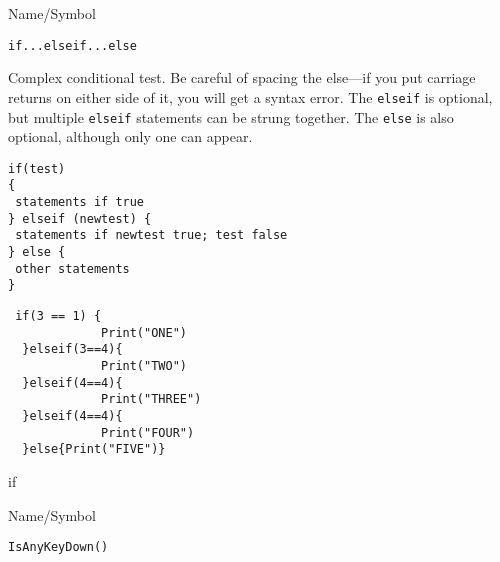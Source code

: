 \rl




\begin{desc}{Name/Symbol}
\item[Name/Symbol]	\verb+if...elseif...else+            

\item[Description] Complex conditional test.  Be careful of spacing
  the else---if you put carriage returns on either side of it, you
  will get a syntax error. The \verb+elseif+ is optional, but
  multiple \verb+elseif+ statements can be strung together.  The
  \verb+else+ is also optional, although only one can appear.

\item[Usage]
\begin{verbatim}
if(test)
{
 statements if true
} elseif (newtest) {
 statements if newtest true; test false
} else {
 other statements
} 
\end{verbatim}

\item[Example]	
\begin{verbatim}
 if(3 == 1) {
             Print("ONE")
  }elseif(3==4){
             Print("TWO")
  }elseif(4==4){
             Print("THREE")
  }elseif(4==4){
             Print("FOUR")
  }else{Print("FIVE")}
\end{verbatim}
\item[See Also]	
if
\end{desc}

\rl


\begin{desc}{Name/Symbol}
\item[Name/Symbol]	\verb+IsAnyKeyDown()+

\item[Description]	

\item[Usage]		

\item[Example]	

\item[See Also]	
\end{desc}

\rl


